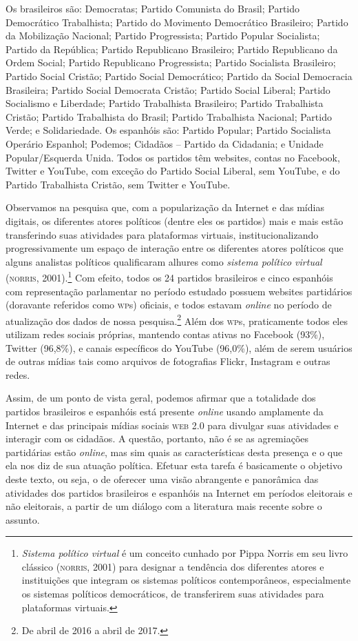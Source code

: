 Os brasileiros são: Democratas; Partido Comunista do Brasil; Partido Democrático
Trabalhista; Partido do Movimento Democrático Brasileiro; Partido da Mobilização
Nacional; Partido Progressista; Partido Popular Socialista; Partido da República; Partido Republicano Brasileiro; Partido Republicano da Ordem Social; Partido Republicano
Progressista; Partido Socialista Brasileiro; Partido Social Cristão; Partido Social
Democrático; Partido da Social Democracia Brasileira; Partido Social
Democrata Cristão; Partido Social Liberal; Partido Socialismo e
Liberdade; Partido Trabalhista Brasileiro; Partido Trabalhista
Cristão; Partido Trabalhista do Brasil; Partido Trabalhista
Nacional; Partido Verde; e Solidariedade.
Os espanhóis são: Partido Popular; Partido Socialista
Operário Espanhol; Podemos; Cidadãos -- Partido da
Cidadania; e Unidade Popular/Esquerda Unida.
Todos os partidos têm websites, contas no Facebook, Twitter e YouTube, com exceção do Partido Social Liberal, sem YouTube, e do Partido Trabalhista Cristão, sem Twitter e YouTube.


Observamos na pesquisa que, com a popularização da Internet e das mídias
digitais, os diferentes atores políticos (dentre eles os partidos) mais
e mais estão transferindo suas atividades para plataformas virtuais,
institucionalizando progressivamente um espaço de interação entre os
diferentes atores políticos que alguns analistas políticos qualificaram
alhures como \textit{sistema político virtual} (\textsc{norris}, 2001).\footnote{\textit{Sistema
  político virtual} é um conceito cunhado por Pippa Norris em seu livro
  clássico (\textsc{norris}, 2001) para designar a tendência dos diferentes
  atores e instituições que integram os sistemas políticos
  contemporâneos, especialmente os sistemas políticos democráticos, de
  transferirem suas atividades para plataformas virtuais.} Com efeito,
todos os 24 partidos brasileiros e cinco espanhóis com representação
parlamentar no período estudado possuem websites partidários (doravante
referidos como \textsc{wp}s) oficiais, e todos estavam \emph{online} no período de
atualização dos dados de nossa pesquisa.\footnote{De abril de 2016 a abril de 2017.}
Além dos \textsc{wp}s, praticamente todos eles utilizam redes sociais próprias,
mantendo contas ativas no Facebook (93\%), Twitter (96,8\%), e canais
específicos do YouTube (96,0\%), além de serem usuários de outras mídias
tais como arquivos de fotografias Flickr, Instagram e outras redes.

Assim, de um ponto de vista geral, podemos afirmar que a totalidade dos
partidos brasileiros e espanhóis está presente \emph{online} usando amplamente
da Internet e das principais mídias sociais \textsc{web 2.0} para divulgar
suas atividades e interagir com os cidadãos. A questão, portanto, não é
se as agremiações partidárias estão \emph{online}, mas sim quais as
características desta presença e o que ela nos diz de sua atuação
política. Efetuar esta tarefa é basicamente o objetivo deste texto, ou
seja, o de oferecer uma visão abrangente e panorâmica das atividades dos
partidos brasileiros e espanhóis na Internet em períodos eleitorais e
não eleitorais, a partir de um diálogo com a literatura mais recente
sobre o assunto.

